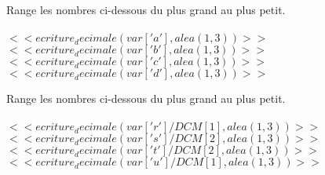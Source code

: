 Range les nombres ci-dessous du plus grand au plus petit.\\ \\



  


$<<ecriture_decimale(var['a'],alea(1,3))>>$ \hfill $<<ecriture_decimale(var['b'],alea(1,3))>>$ \hfill $<<ecriture_decimale(var['c'],alea(1,3))>>$ \hfill $<<ecriture_decimale(var['d'],alea(1,3))>>$



\bigskip
Range les nombres ci-dessous du plus grand au plus petit.\\ \\



$<<ecriture_decimale(var['r']/DCM[1],alea(1,3))>>$ \hfill $<<ecriture_decimale(var['s']/DCM[2],alea(1,3))>>$ \hfill $<<ecriture_decimale(var['t']/DCM[2],alea(1,3))>>$ \hfill $<<ecriture_decimale(var['u']/DCM[1],alea(1,3))>>$

